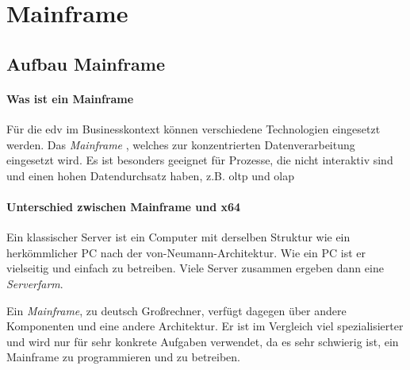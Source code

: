 \chapter{Mainframe}

\section{Aufbau Mainframe}

\subsubsection{Was ist ein Mainframe}
Für die \ac{edv} im Businesskontext können verschiedene Technologien eingesetzt werden. Das \emph{Mainframe} \cite[ist ein zentrales Datenlager]{redbook.1}, welches zur konzentrierten Datenverarbeitung eingesetzt wird. Es ist besonders geeignet für Prozesse, die nicht interaktiv sind und einen hohen Datendurchsatz haben, z.B. \ac{oltp} und \ac{olap}


\subsubsection[Z Systems vs. x64]{Unterschied zwischen Mainframe und x64}
Ein klassischer Server ist ein Computer mit derselben Struktur wie ein herkömmlicher PC nach der \mbox{von-Neumann-Architektur}. Wie ein PC ist er vielseitig und einfach zu betreiben. Viele Server zusammen ergeben dann eine \emph{Serverfarm}.

Ein \emph{Mainframe}, zu deutsch Großrechner, verfügt dagegen über andere Komponenten und eine andere Architektur. Er ist im Vergleich viel spezialisierter und wird nur für sehr konkrete Aufgaben verwendet, da es sehr schwierig ist, ein Mainframe zu programmieren und zu betreiben.


